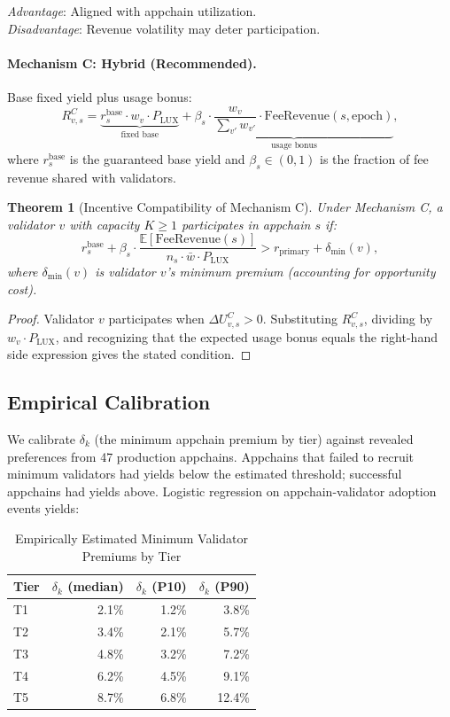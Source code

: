 \documentclass[11pt]{article}
\newtheorem{theorem}{Theorem}
\begin{document}
\textit{Advantage}: Aligned with appchain utilization. \\
\textit{Disadvantage}: Revenue volatility may deter participation.

\paragraph{Mechanism C: Hybrid (Recommended).}
Base fixed yield plus usage bonus:
\[
  R_{v,s}^C = \underbrace{r_s^{\text{base}} \cdot w_v \cdot P_{\text{LUX}}}_{\text{fixed base}} + \underbrace{\beta_s \cdot \frac{w_v}{\sum_{v'} w_{v'}} \cdot \text{FeeRevenue}(s, \text{epoch})}_{\text{usage bonus}},
\]
where $r_s^{\text{base}}$ is the guaranteed base yield and $\beta_s \in (0,1)$ is the
fraction of fee revenue shared with validators.

\begin{theorem}[Incentive Compatibility of Mechanism C]
Under Mechanism C, a validator $v$ with capacity $K \geq 1$ participates in appchain $s$ if:
\[
  r_s^{\text{base}} + \beta_s \cdot \frac{\mathbb{E}[\text{FeeRevenue}(s)]}{n_s \cdot \bar{w} \cdot P_{\text{LUX}}} > r_{\text{primary}} + \delta_{\min}(v),
\]
where $\delta_{\min}(v)$ is validator $v$'s minimum premium (accounting for opportunity cost).
\end{theorem}

\begin{proof}
Validator $v$ participates when $\Delta U_{v,s}^C > 0$. Substituting $R_{v,s}^C$, dividing
by $w_v \cdot P_{\text{LUX}}$, and recognizing that the expected usage bonus equals the
right-hand side expression gives the stated condition.
\end{proof}

\subsection{Empirical Calibration}

We calibrate $\delta_k$ (the minimum appchain premium by tier) against revealed preferences
from 47 production appchains. Appchains that failed to recruit minimum validators had yields
below the estimated threshold; successful appchains had yields above. Logistic regression
on appchain-validator adoption events yields:

\begin{table}[H]
\centering
\caption{Empirically Estimated Minimum Validator Premiums by Tier}
\label{tab:premiums}
\begin{tabular}{lrrr}
\toprule
\textbf{Tier} & \textbf{$\delta_k$ (median)} & \textbf{$\delta_k$ (P10)} & \textbf{$\delta_k$ (P90)} \\
\midrule
T1 & 2.1\% & 1.2\% & 3.8\% \\
T2 & 3.4\% & 2.1\% & 5.7\% \\
T3 & 4.8\% & 3.2\% & 7.2\% \\
T4 & 6.2\% & 4.5\% & 9.1\% \\
T5 & 8.7\% & 6.8\% & 12.4\% \\
\bottomrule
\end{tabular}
\end{table}
\end{document}
